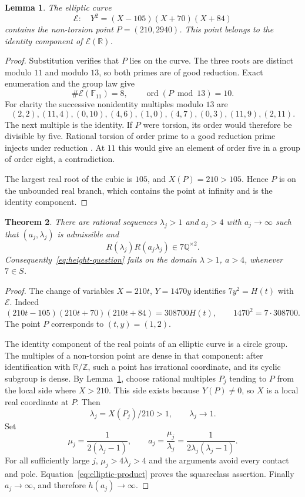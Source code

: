 \documentclass[11pt,a4paper]{article}
\newtheorem{theorem}{Theorem}[section]
\newtheorem{lemma}[theorem]{Lemma}
\newcommand{\Q}{\mathbb Q}\newcommand{\Z}{\mathbb Z}
\begin{document}
\begin{lemma}\label{lem:elliptic-point}
The elliptic curve
\[
                \mathcal E:\quad Y^2=(X-105)(X+70)(X+84)
\]
contains the non-torsion point $P=(210,2940)$. This point belongs
to the identity component of $\mathcal E(\mathbb R)$.
\end{lemma}
\begin{proof}
Substitution verifies that $P$ lies on the curve. The three roots
are distinct modulo $11$ and modulo $13$, so both primes are of
good reduction. Exact enumeration and the group law give
\[
 \#\mathcal E(\mathbb F_{11})=8,\qquad
                    \operatorname{ord}(P\bmod13)=10.
\]
For clarity the successive nonidentity multiples modulo $13$ are
\[
 (2,2),(11,4),(0,10),(4,6),(1,0),
 (4,7),(0,3),(11,9),(2,11).
\]
The next multiple is the identity. If $P$ were torsion, its order
would therefore be divisible by five. Rational torsion of order
prime to a good reduction prime injects under reduction
\cite[Chapter~VII, Section~3]{Silverman}. At $11$ this would give
an element of order five in a group of order eight, a contradiction.

The largest real root of the cubic is $105$, and $X(P)=210>105$.
Hence $P$ is on the unbounded real branch, which contains the point
at infinity and is the identity component.
\end{proof}

\begin{theorem}\label{thm:elliptic}
There are rational sequences $\lambda_j>1$ and $a_j>4$ with
$a_j\to\infty$ such that $(a_j,\lambda_j)$ is admissible and
\[
                      R(\lambda_j)R(a_j\lambda_j)
                                      \in7\Q^{\times2}.
\]
Consequently~\eqref{eq:height-question} fails on the domain
$\lambda>1$, $a>4$, whenever $7\in S$.
\end{theorem}
\begin{proof}
The change of variables $X=210t$, $Y=1470y$ identifies
$7y^2=H(t)$ with $\mathcal E$. Indeed
\[
 (210t-105)(210t+70)(210t+84)=308700H(t),
 \qquad1470^2=7\cdot308700.
\]
The point $P$ corresponds to $(t,y)=(1,2)$.

The identity component of the real points of an elliptic curve is a
circle group. The multiples of a non-torsion point are dense in that
component: after identification with $\mathbb R/\mathbb Z$, such a
point has irrational coordinate, and its cyclic subgroup is dense.
By Lemma~\ref{lem:elliptic-point}, choose rational multiples $P_j$
tending to $P$ from the local side where $X>210$. This side exists
because $Y(P)\ne0$, so $X$ is a local real coordinate at $P$.
Then
\[
                    \lambda_j=X(P_j)/210>1,\qquad
                    \lambda_j\longrightarrow1.
\]
Set
\[
 \mu_j=\frac1{2(\lambda_j-1)},\qquad
 a_j=\frac{\mu_j}{\lambda_j}
            =\frac1{2\lambda_j(\lambda_j-1)}.
\]
For all sufficiently large $j$, $\mu_j>4\lambda_j>4$ and the
arguments avoid every contact and pole. Equation~\eqref{eq:elliptic-product}
proves the squareclass assertion. Finally $a_j\to\infty$, and
therefore $h(a_j)\to\infty$.
\end{proof}
\end{document}
